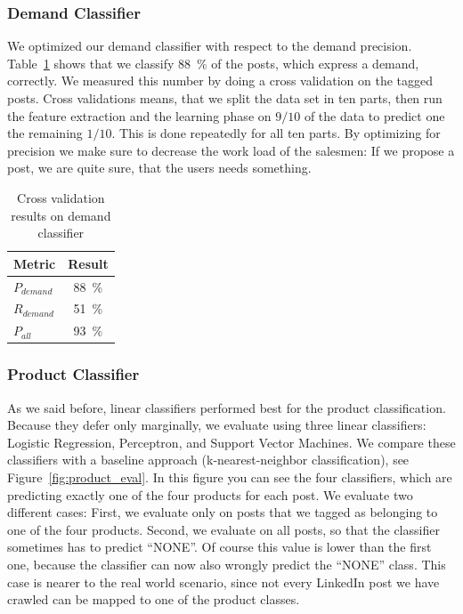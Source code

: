 \subsubsection{Demand Classifier}
\label{ssub:demand_classifier}

We optimized our demand classifier with respect to the demand precision.
Table~\ref{table:demand_evaluation} shows that we classify 88~\% of the posts, which express a demand, correctly.
We measured this number by doing a cross validation on the tagged posts.
Cross validations means, that we split the data set in ten parts, then run the feature extraction and the learning phase on $9 / 10$ of the data to predict one the remaining $1 / 10$.
This is done repeatedly for all ten parts.
By optimizing for precision we make sure to decrease the work load of the salesmen: If we propose a post, we are quite sure, that the users needs something.

\begin{table}[h]
	\centering
	\begin{tabular}{lc}
		\hline
		\textbf{Metric} & \textbf{Result}  \\
		\hline
		\hline
		$P_{demand}$ & 88~\% \\
		\hline
		$R_{demand}$ & 51~\%  \\
		\hline
		$P_{all}$ & 93~\%  \\
		\hline
	\end{tabular}
	\caption{Cross validation results on demand classifier}
	\label{table:demand_evaluation}
\end{table}

\subsubsection{Product Classifier}
\label{ssub:product_classifier}

As we said before, linear classifiers performed best for the product classification.
Because they defer only marginally, we evaluate using three linear classifiers: Logistic Regression, Perceptron, and Support Vector Machines.
We compare these classifiers with a baseline approach (k-nearest-neighbor classification), see Figure~\ref{fig:product_eval}.
In this figure you can see the four classifiers, which are predicting exactly one of the four products for each post.
We evaluate two different cases:
First, we evaluate only on posts that we tagged as belonging to one of the four products.
Second, we evaluate on all posts, so that the classifier sometimes has to predict ``NONE''.
Of course this value is lower than the first one, because the classifier can now also wrongly predict the ``NONE'' class.
This case is nearer to the real world scenario, since not every LinkedIn post we have crawled can be mapped to one of the product classes.

